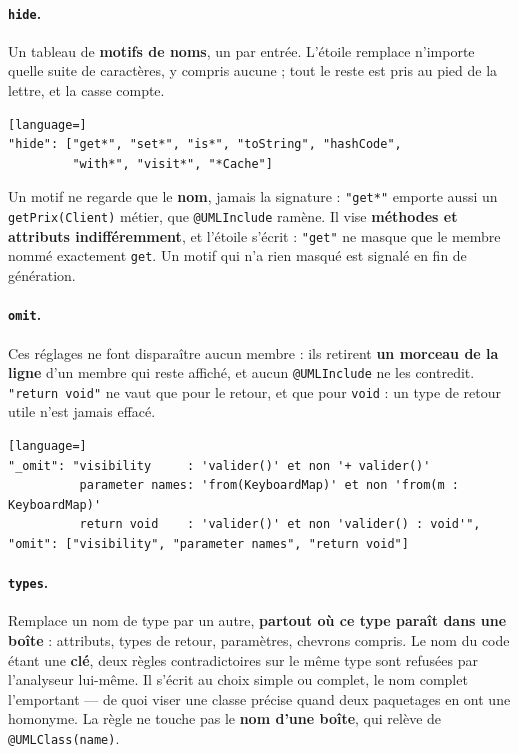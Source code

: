 \documentclass[12pt, a4paper]{article}
\begin{document}
\paragraph{\texttt{hide}.} Un tableau de \textbf{motifs de noms}, un par entrée. L'étoile remplace n'importe quelle suite de caractères, y compris aucune ; tout le reste est pris au pied de la lettre, et la casse compte.

\begin{lstlisting}[language=]
"hide": ["get*", "set*", "is*", "toString", "hashCode",
         "with*", "visit*", "*Cache"]
\end{lstlisting}
Un motif ne regarde que le \textbf{nom}, jamais la signature : \texttt{"get*"} emporte aussi un \texttt{getPrix(Client)} métier, que \texttt{@UMLInclude} ramène. Il vise \textbf{méthodes et attributs indifféremment}, et l'étoile s'écrit : \texttt{"get"} ne masque que le membre nommé exactement \texttt{get}. Un motif qui n'a rien masqué est signalé en fin de génération.

\paragraph{\texttt{omit}.} Ces réglages ne font disparaître aucun membre : ils retirent \textbf{un morceau de la ligne} d'un membre qui reste affiché, et aucun \texttt{@UMLInclude} ne les contredit. \texttt{"return void"} ne vaut que pour le retour, et que pour \texttt{void} : un type de retour utile n'est jamais effacé.

\begin{lstlisting}[language=]
"_omit": "visibility     : 'valider()' et non '+ valider()'
          parameter names: 'from(KeyboardMap)' et non 'from(m : KeyboardMap)'
          return void    : 'valider()' et non 'valider() : void'",
"omit": ["visibility", "parameter names", "return void"]
\end{lstlisting}

\paragraph{\texttt{types}.} Remplace un nom de type par un autre, \textbf{partout où ce type paraît dans une boîte} : attributs, types de retour, paramètres, chevrons compris. Le nom du code étant une \textbf{clé}, deux règles contradictoires sur le même type sont refusées par l'analyseur lui-même. Il s'écrit au choix simple ou complet, le nom complet l'emportant --- de quoi viser une classe précise quand deux paquetages en ont une homonyme. La règle ne touche pas le \textbf{nom d'une boîte}, qui relève de \texttt{@UMLClass(name)}.
\end{document}
